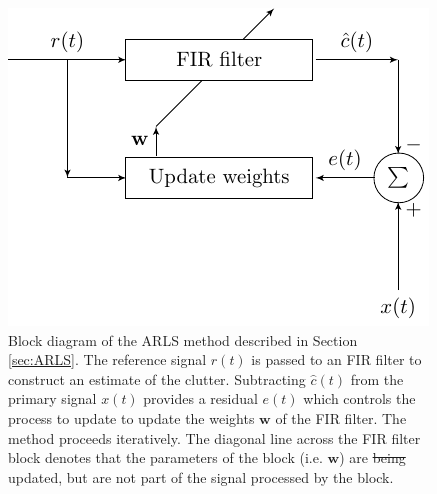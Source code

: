 \documentclass[pra,superscriptaddress,reprint,amsmath,amssymb,nofootinbib]{revtex4-2}
\providecommand{\DIFaddtex}[1]{{\protect\color{blue}\uwave{#1}}} %
\providecommand{\DIFdeltex}[1]{{\protect\color{red}\sout{#1}}}                      %
\providecommand{\DIFaddFL}[1]{\DIFadd{#1}} %
\providecommand{\DIFdelFL}[1]{\DIFdel{#1}} %
\providecommand{\DIFaddbeginFL}{} %
\providecommand{\DIFaddendFL}{} %
\providecommand{\DIFdelbeginFL}{} %
\providecommand{\DIFdelendFL}{} %
\providecommand{\DIFadd}[1]{\texorpdfstring{\DIFaddtex{#1}}{#1}} %
\providecommand{\DIFdel}[1]{\texorpdfstring{\DIFdeltex{#1}}{}} %
\newcommand{\DIFscaledelfig}{0.5}
\newlength{\DIFdelgraphicswidth} %
\newlength{\DIFdelgraphicsheight} %
\newcommand{\DIFaddincludegraphics}[2][]{{\color{blue}\fbox{\DIFOincludegraphics[#1]{#2}}}} %
\newcommand{\DIFdelincludegraphics}[2][]{%
\sbox{\DIFdelgraphicsbox}{\DIFOincludegraphics[#1]{#2}}%
\settoboxwidth{\DIFdelgraphicswidth}{\DIFdelgraphicsbox} %
\settoboxtotalheight{\DIFdelgraphicsheight}{\DIFdelgraphicsbox} %
\scalebox{\DIFscaledelfig}{%
\parbox[b]{\DIFdelgraphicswidth}{\usebox{\DIFdelgraphicsbox}\\[-\baselineskip] \rule{\DIFdelgraphicswidth}{0em}}\llap{\resizebox{\DIFdelgraphicswidth}{\DIFdelgraphicsheight}{%
\setlength{\unitlength}{\DIFdelgraphicswidth}%
\begin{picture}(1,1)%
\thicklines\linethickness{2pt} %
{\color[rgb]{1,0,0}\put(0,0){\framebox(1,1){}}}%
{\color[rgb]{1,0,0}\put(0,0){\line( 1,1){1}}}%
{\color[rgb]{1,0,0}\put(0,1){\line(1,-1){1}}}%
\end{picture}%
}\hspace*{3pt}}} %
} %
\DeclareRobustCommand{\DIFaddbeginFL}{\DIFOaddbeginFL \let\includegraphics\DIFaddincludegraphics} %
\DeclareRobustCommand{\DIFaddendFL}{\DIFOaddendFL \let\includegraphics\DIFOincludegraphics} %
\DeclareRobustCommand{\DIFdelbeginFL}{\DIFOdelbeginFL \let\includegraphics\DIFdelincludegraphics} %
\DeclareRobustCommand{\DIFdelendFL}{\DIFOaddendFL \let\includegraphics\DIFOincludegraphics} %
\begin{document}
\begin{figure}
	\begin{center}
		\includegraphics[width=\columnwidth]{images/fir_block_2.pdf}
	\end{center}
	\caption{Block diagram of the ARLS method described in Section \ref{sec:ARLS}. The reference signal $r(t)$ is passed to an FIR filter to construct an estimate \DIFaddbeginFL \DIFaddFL{$\hat{c}(t)$ }\DIFaddendFL of the clutter. Subtracting $\hat{c}(t)$ from the primary signal $x(t)$ provides a residual $e(t)$ which controls the process to update to update the weights $\mathbf{w}$ of the FIR filter. The method proceeds iteratively. The diagonal line across the FIR filter block denotes that the parameters of the block (i.e. $\mathbf{w}$) are \DIFdelbeginFL \DIFdelFL{being }\DIFdelendFL updated, but are not part of the signal processed by the block.}
	\label{fig:arlsBlock}
\end{figure}
\end{document}
